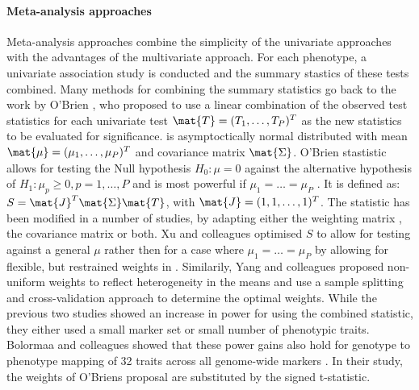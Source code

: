  \paragraph{Meta-analysis approaches}
Meta-analysis approaches combine the simplicity of the univariate approaches with the advantages of the multivariate approach. For each phenotype, a univariate association study is conducted and the summary stastics of these tests combined. Many methods for combining the summary statistics \citep{Xu2003,Yang2010,Yang2012,Bolormaa2014} go back to the work by O'Brien \citep{O'Brien1984}, who proposed to use a linear combination of the observed test statistics for each univariate test \(\mat{T} =(T_1, \dots, T_P)^T\) as the new statistics to be evaluated for significance.   is asymptoctically normal distributed with mean \(\mat{\mu} = (\mu_1,\ldots, \mu_P)^T\) and covariance matrix \(\mat{\Sigma}\). O'Brien stastistic allows for testing the Null hypothesis \(H_0: \mu = 0\) against the alternative hypothesis of  \(H_1: \mu_p \ge 0, p=1, \ldots , P \) and is most powerful if \(\mu_1= \ldots =\mu_P\) \citep{Xu2003}. It is defined as: \(S = \mat{J}^T \mat{\Sigma}\mat{T}\), with \(\mat{J} = (1, 1, \ldots, 1)^T\).  The statistic has been modified in a number of studies, by adapting either the weighting matrix , the covariance matrix \tmat{\Sigma} or both. Xu and colleagues \citeyear{Xu2003} optimised \(S\) to allow for testing against a general \(\mu\) rather then for a case where  \(\mu_1= \ldots =\mu_P\) by allowing for flexible, but restrained weights in . Similarily, Yang and colleagues  \citeyear{Yang2010} proposed non-uniform weights to reflect heterogeneity in the means and use a sample splitting and cross-validation approach to determine the optimal weights. 
While the previous two studies showed an increase in power for using the combined statistic, they either used a small marker set or small number of phenotypic traits.  Bolormaa and colleagues showed that these power gains also hold for genotype to phenotype mapping of 32 traits across all genome-wide markers \citep{Bolormaa2014}. In their study, the weights of O'Briens proposal are substituted by the signed t-statistic. 

